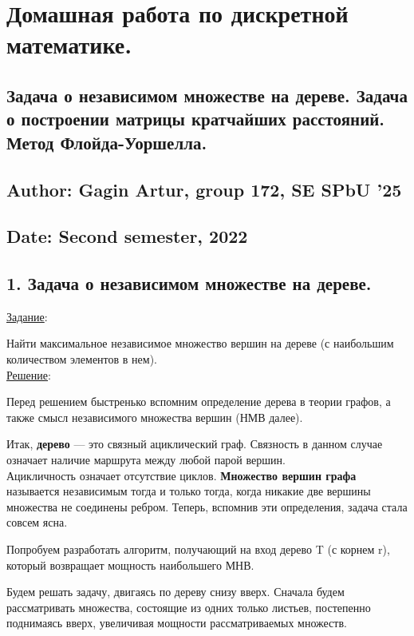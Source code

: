 \documentclass[12pt]{article}
\begin{document}
\section*{Домашная работа по дискретной математике.}

\subsection*{}
\subsection*{Задача о независимом множестве на дереве.
Задача о построении матрицы кратчайших расстояний. 
Метод Флойда-Уоршелла.
}
\subsection*{Author: Gagin Artur, group 172, SE SPbU '25}
\subsection*{Date: Second semester, 2022}

\*
\subsection*{1. Задача о независимом множестве на дереве.}
\underline{Задание}:

Найти максимальное независимое множество вершин на дереве 
(с наибольшим количеством элементов в нем). \\
\underline{Решение}: 

Перед решением быстренько вспомним определение дерева 
в теории графов, а также смысл независимого множества вершин (НМВ далее).

Итак, \textbf{дерево} — это связный ациклический граф. 
Связность в данном случае означает наличие маршрута между любой парой вершин. \\
Ацикличность означает отсутствие циклов. \textbf{Множество вершин графа} называется независимым тогда и только тогда, когда никакие две вершины множества не соединены ребром. 
Теперь, вспомнив эти определения, задача стала совсем ясна.

Попробуем разработать алгоритм, получающий на вход дерево T (с корнем r), который возвращает мощность наибольшего МНВ.

Будем решать задачу, двигаясь по дереву снизу вверх. Сначала будем рассматривать множества, состоящие из одних только листьев, постепенно поднимаясь вверх, увеличивая мощности рассматриваемых множеств.
\end{document}
